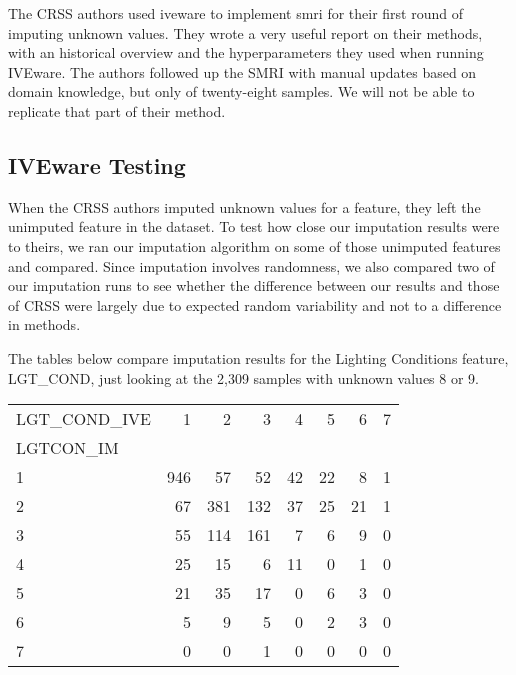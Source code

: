 The CRSS authors used \acrfull{iveware} to implement \acrfull{smri} for their first round of imputing unknown values.  \cite{IVEware} \cite{Raghunathan_2001}  They wrote a very useful report on their methods, with an historical overview and the hyperparameters they used when running IVEware.  \cite{CRSS_Imputation}  The authors followed up the SMRI with manual updates based on domain knowledge, but only of twenty-eight samples.   We will not be able to replicate that part of their method.


\subsection{IVEware Testing}

When the CRSS authors imputed unknown values for a feature, they left the unimputed feature in the dataset.  To test how close our imputation results were to theirs, we ran our imputation algorithm on some of those unimputed features and compared.  Since imputation involves randomness, we also compared two of our imputation runs to see whether the difference between our results and those of CRSS were largely due to expected random variability and not to a difference in methods.  

The tables below compare imputation results for the Lighting Conditions feature, LGT\_COND, just looking at the 2,309 samples with unknown values 8 or 9.  




\begin{tabular}{lrrrrrrr}
LGT\_COND\_IVE &    1 &    2 &    3 &   4 &   5 &   6 &  7 \\
LGTCON\_IM &      &      &      &     &     &     &    \\
\hline
1         &  946 &   57 &   52 &  42 &  22 &   8 &  1 \\
2         &   67 &  381 &  132 &  37 &  25 &  21 &  1 \\
3         &   55 &  114 &  161 &   7 &   6 &   9 &  0 \\
4         &   25 &   15 &    6 &  11 &   0 &   1 &  0 \\
5         &   21 &   35 &   17 &   0 &   6 &   3 &  0 \\
6         &    5 &    9 &    5 &   0 &   2 &   3 &  0 \\
7         &    0 &    0 &    1 &   0 &   0 &   0 &  0 \\
\end{tabular}

